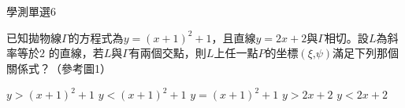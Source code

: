 \begin{QUESTIONS}
    \begin{QUESTION}
        \begin{ExamInfo}{85}{學測}{單選}{6}
        \end{ExamInfo}
        \begin{ExamAnsRateInfo}{}{}{}{}
        \end{ExamAnsRateInfo}
        \begin{QBODY}
            已知拋物線$\Gamma $的方程式為$y={{\left( x+1 \right)}^{2}}+1$，且直線$y=2x+2$與$\Gamma $相切。設$L$為斜率等於$2$ 的直線，若$L$與$\Gamma $有兩個交點，則$L$上任一點$P$的坐標$\left( \xi \text{,}\psi  \right)$滿足下列那個關係式？（參考圖1）
            \begin{QOPS} 
 \QOP$y>{{\left( x+1 \right)}^{2}}+1$	
            \QOP$y<{{\left( x+1 \right)}^{2}}+1$
            \QOP$y={{\left( x+1 \right)}^{2}}+1$	
            \QOP$y>2x+2$ 
            \QOP$y<2x+2$
            \end{QOPS}            
            

\end{QBODY}
\end{QUESTION}
\end{QUESTIONS}
